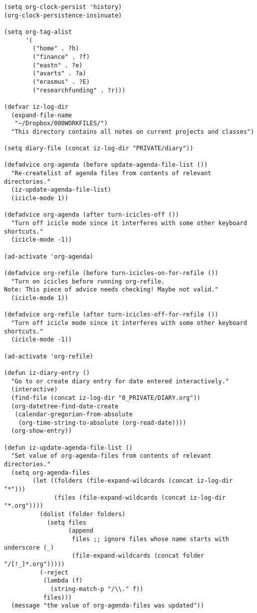 \documentclass{article}
\begin{document}
\begin{verbatim}
(setq org-clock-persist 'history)
(org-clock-persistence-insinuate)

(setq org-tag-alist
      '(
        ("home" . ?h)
        ("finance" . ?f)
        ("eastn" . ?e)
        ("avarts" . ?a)
        ("erasmus" . ?E)
        ("researchfunding" . ?r)))

(defvar iz-log-dir
  (expand-file-name
   "~/Dropbox/000WORKFILES/")
  "This directory contains all notes on current projects and classes")

(setq diary-file (concat iz-log-dir "PRIVATE/diary"))

(defadvice org-agenda (before update-agenda-file-list ())
  "Re-createlist of agenda files from contents of relevant directories."
  (iz-update-agenda-file-list)
  (icicle-mode 1))

(defadvice org-agenda (after turn-icicles-off ())
  "Turn off icicle mode since it interferes with some other keyboard shortcuts."
  (icicle-mode -1))

(ad-activate 'org-agenda)

(defadvice org-refile (before turn-icicles-on-for-refile ())
  "Turn on icicles before running org-refile.
Note: This piece of advice needs checking! Maybe not valid."
  (icicle-mode 1))

(defadvice org-refile (after turn-icicles-off-for-refile ())
  "Turn off icicle mode since it interferes with some other keyboard shortcuts."
  (icicle-mode -1))

(ad-activate 'org-refile)

(defun iz-diary-entry ()
  "Go to or create diary entry for date entered interactively."
  (interactive)
  (find-file (concat iz-log-dir "0_PRIVATE/DIARY.org"))
  (org-datetree-find-date-create
   (calendar-gregorian-from-absolute
    (org-time-string-to-absolute (org-read-date))))
  (org-show-entry))

(defun iz-update-agenda-file-list ()
  "Set value of org-agenda-files from contents of relevant directories."
  (setq org-agenda-files
        (let ((folders (file-expand-wildcards (concat iz-log-dir "*")))
              (files (file-expand-wildcards (concat iz-log-dir "*.org"))))
          (dolist (folder folders)
            (setq files
                  (append
                   files ;; ignore files whose name starts with underscore (_)
                   (file-expand-wildcards (concat folder "/[!_]*.org")))))
          (-reject
           (lambda (f)
             (string-match-p "/\\." f))
           files)))
  (message "the value of org-agenda-files was updated"))


\end{verbatim}
\end{document}
